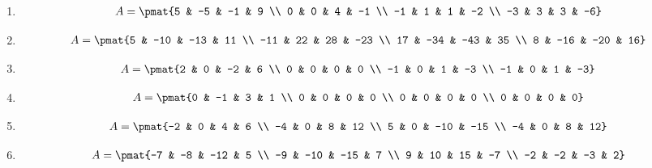 \begin{enumerate}
\item

\begin{align*}
A = \pmat{5 & -5 & -1 & 9 \\ 0 & 0 & 4 & -1 \\ -1 & 1 & 1 & -2 \\ -3 & 3 & 3 & -6}
\end{align*}

\item

\begin{align*}
A = \pmat{5 & -10 & -13 & 11 \\ -11 & 22 & 28 & -23 \\ 17 & -34 & -43 & 35 \\ 8 & -16 & -20 & 16}
\end{align*}

\item

\begin{align*}
A = \pmat{2 & 0 & -2 & 6 \\ 0 & 0 & 0 & 0 \\ -1 & 0 & 1 & -3 \\ -1 & 0 & 1 & -3}
\end{align*}

\item

\begin{align*}
A = \pmat{0 & -1 & 3 & 1 \\ 0 & 0 & 0 & 0 \\ 0 & 0 & 0 & 0 \\ 0 & 0 & 0 & 0}
\end{align*}

\item

\begin{align*}
A = \pmat{-2 & 0 & 4 & 6 \\ -4 & 0 & 8 & 12 \\ 5 & 0 & -10 & -15 \\ -4 & 0 & 8 & 12}
\end{align*}

\item

\begin{align*}
A = \pmat{-7 & -8 & -12 & 5 \\ -9 & -10 & -15 & 7 \\ 9 & 10 & 15 & -7 \\ -2 & -2 & -3 & 2}
\end{align*}


\end{enumerate}
